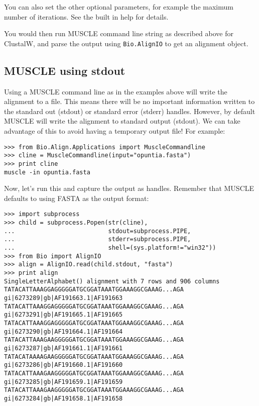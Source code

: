 \documentclass{report}
\begin{document}
You can also set the other optional parameters, for example the maximum number
of iterations. See the built in help for details.

You would then run MUSCLE command line string as described above for
ClustalW, and parse the output using \verb|Bio.AlignIO| to get an
alignment object.

\subsection{MUSCLE using stdout}

Using a MUSCLE command line as in the examples above will write the alignment
to a file. This means there will be no important information written to the
standard out (stdout) or standard error (stderr) handles. However, by default
MUSCLE will write the alignment to standard output (stdout). We can take
advantage of this to avoid having a temporary output file! For example:

\begin{verbatim}
>>> from Bio.Align.Applications import MuscleCommandline
>>> cline = MuscleCommandline(input="opuntia.fasta")
>>> print cline
muscle -in opuntia.fasta
\end{verbatim}

\noindent Now, let's run this and capture the output as handles.
Remember that MUSCLE defaults to using FASTA as the output format:

\begin{verbatim}
>>> import subprocess
>>> child = subprocess.Popen(str(cline),
...                          stdout=subprocess.PIPE,
...                          stderr=subprocess.PIPE,
...                          shell=(sys.platform!="win32"))
>>> from Bio import AlignIO
>>> align = AlignIO.read(child.stdout, "fasta")
>>> print align
SingleLetterAlphabet() alignment with 7 rows and 906 columns
TATACATTAAAGGAGGGGGATGCGGATAAATGGAAAGGCGAAAG...AGA gi|6273289|gb|AF191663.1|AF191663
TATACATTAAAGGAGGGGGATGCGGATAAATGGAAAGGCGAAAG...AGA gi|6273291|gb|AF191665.1|AF191665
TATACATTAAAGGAGGGGGATGCGGATAAATGGAAAGGCGAAAG...AGA gi|6273290|gb|AF191664.1|AF191664
TATACATTAAAGAAGGGGGATGCGGATAAATGGAAAGGCGAAAG...AGA gi|6273287|gb|AF191661.1|AF191661
TATACATAAAAGAAGGGGGATGCGGATAAATGGAAAGGCGAAAG...AGA gi|6273286|gb|AF191660.1|AF191660
TATACATTAAAGAAGGGGGATGCGGATAAATGGAAAGGCGAAAG...AGA gi|6273285|gb|AF191659.1|AF191659
TATACATTAAAGAAGGGGGATGCGGATAAATGGAAAGGCGAAAG...AGA gi|6273284|gb|AF191658.1|AF191658
\end{verbatim}
\end{document}

